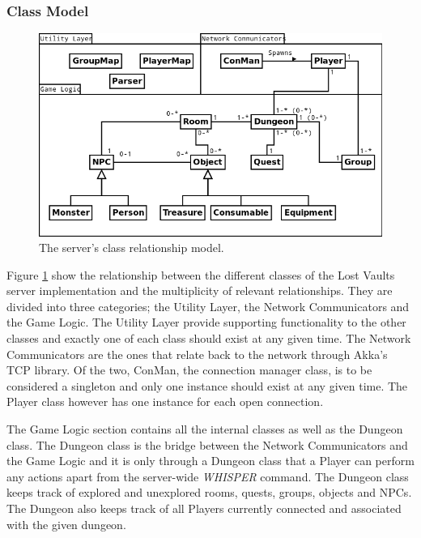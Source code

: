 \documentclass[a4paper]{article}
\begin{document}
\subsubsection{Class Model}
\begin{figure}[ht]
\centering
\includegraphics[width=1.0\textwidth]{serveruml1}
\caption{\label{fig:ServerUML}The server's class relationship model.}
\end{figure}
Figure \ref{fig:ServerUML} show the relationship between the different classes of the Lost Vaults server implementation and the multiplicity of relevant relationships. They are divided 
into three categories; the Utility Layer, the Network Communicators and the Game Logic. The Utility Layer provide supporting functionality to the other classes and exactly one of each 
class should exist at any given time. The Network Communicators are the ones that relate back to the network through Akka's TCP library. Of the two, ConMan, the connection manager class, 
is to be considered a singleton and only one instance should exist at any given time. The Player class however has one instance for each open connection.

The Game Logic section contains all the internal classes as well as the Dungeon class. The Dungeon class is the bridge between the Network Communicators and the Game Logic and it is 
only through a Dungeon class that a Player can perform any actions apart from the server-wide \textit{WHISPER} command. The Dungeon class keeps track of explored and unexplored rooms, 
quests, groups, objects and NPCs. The Dungeon also keeps track of all Players currently connected and associated with the given dungeon.
\end{document}
